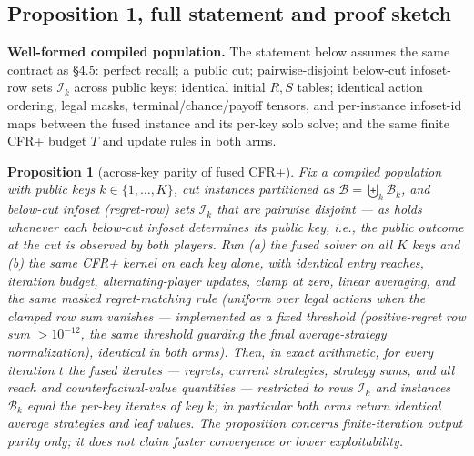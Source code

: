 \documentclass[11pt]{article}
\newtheorem{proposition}{Proposition}
\begin{document}
\subsection{Proposition 1, full statement and proof sketch}

\textbf{Well-formed compiled population.} The statement below assumes the same contract
as \S4.5: perfect recall; a public cut; pairwise-disjoint below-cut infoset-row sets
$\mathcal{I}_k$ across public keys; identical initial $R,S$ tables; identical action
ordering, legal masks, terminal/chance/payoff tensors, and per-instance infoset-id maps
between the fused instance and its per-key solo solve; and the same finite CFR+ budget
$T$ and update rules in both arms.

\begin{proposition}[across-key parity of fused CFR+]
Fix a compiled population with public keys $k \in \{1,\dots,K\}$, cut instances
partitioned as $\mathcal{B} = \biguplus_k \mathcal{B}_k$, and below-cut infoset
(regret-row) sets $\mathcal{I}_k$ that are pairwise disjoint --- as holds whenever each
below-cut infoset determines its public key, i.e., the public outcome at the cut is
observed by both players. Run (a) the fused solver on all $K$ keys and (b) the same CFR+
kernel on each key alone, with identical entry reaches, iteration budget,
alternating-player updates, clamp at zero, linear averaging, and the same masked
regret-matching rule (uniform over legal actions when the clamped row sum vanishes ---
implemented as a fixed threshold (positive-regret row sum $> 10^{-12}$, the same
threshold guarding the final average-strategy normalization), identical in both arms).
Then, in exact arithmetic, for every iteration $t$ the fused iterates --- regrets,
current strategies, strategy sums, and all reach and counterfactual-value quantities ---
restricted to rows $\mathcal{I}_k$ and instances $\mathcal{B}_k$ equal the per-key
iterates of key $k$; in particular both arms return identical average strategies and
leaf values. The proposition concerns finite-iteration output parity only; it does not
claim faster convergence or lower exploitability.
\end{proposition}
\end{document}
